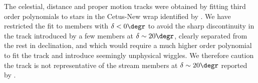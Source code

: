 The celestial, distance and proper motion tracks were obtained by fitting third order polynomials to stars in the Cetus-New wrap identified by \citet[][data provided by Z. Yuan priv. comm.]{Yuan2021}. We have restricted the fit to members with $\delta<0\degr$ to avoid the sharp discontinuity in the track introduced by a few members at $\delta\sim20\degr$, clearly separated from the rest in declination, and which would require a much higher order polynomial to fit the track and introduce seemingly unphysical wiggles.  We therefore caution the track is not representative of the stream members at $\delta\sim20\degr$ reported by \citet{Yuan2021}.
